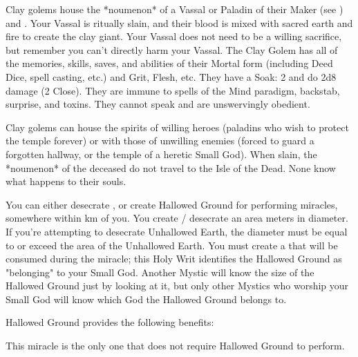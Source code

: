 {Clay golems house the *noumenon* of a Vassal or Paladin of their Maker (see ) and .  Your Vassal is ritually slain, and their blood is mixed with sacred earth and fire to create the clay giant. Your Vassal does not need to be a willing sacrifice, but remember you can't directly harm your Vassal.  The Clay Golem has all of the memories, skills, saves, and abilities of their Mortal form (including Deed Dice, spell casting, etc.) and Grit, Flesh, etc.  They have a Soak: 2 and do 2d8 damage (2 Close).  They are immune to spells of the Mind paradigm, backstab, surprise, and toxins. They cannot speak and are unswervingly obedient.

Clay golems can house the spirits of willing heroes (paladins who wish to protect the temple forever) or with those of unwilling enemies (forced to guard a forgotten hallway, or the temple of a heretic Small God).  When slain, the *noumenon* of the deceased do not travel to the Isle of the Dead.  None know what happens to their souls. 



You can either desecrate , or create Hallowed Ground for performing miracles, somewhere within \DICE km of you.  You create / desecrate an area \DICE meters in diameter.  If you're attempting to desecrate Unhallowed Earth, the diameter must be equal to or exceed the area of the Unhallowed Earth.  You must create a  that will be consumed during the miracle; this Holy Writ identifies the Hallowed Ground as "belonging" to your Small God.  Another Mystic will know the size of the Hallowed Ground just by looking at it, but only other Mystics who worship your Small God will know which God the Hallowed Ground belongs to.


Hallowed Ground provides the following benefits:


This miracle is the only one that does {not} require Hallowed Ground to perform.

}
